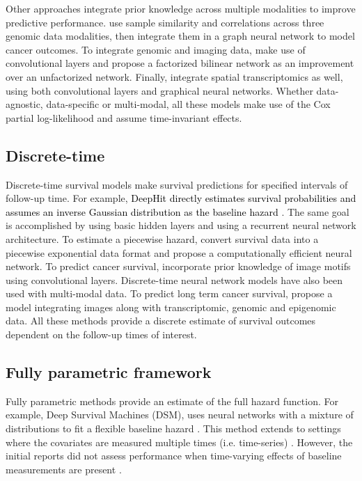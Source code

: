 \documentclass[preprint,12pt,authoryear]{elsarticle}
\begin{document}
Other approaches integrate prior knowledge across multiple modalities to improve predictive performance. \citet{hao2022joint} use sample similarity and correlations across three genomic data modalities, then integrate them in a graph neural network to model cancer outcomes. To integrate genomic and imaging data, \citet{mobadersany2018predicting} make use of convolutional layers and \citet{li2022hfbsurv} propose a factorized bilinear network as an improvement over an unfactorized network. Finally, \citet{chen2020pathomic} integrate spatial transcriptomics as well, using both convolutional layers and graphical neural networks. Whether data-agnostic, data-specific or multi-modal, all these models make use of the Cox partial log-likelihood and assume time-invariant effects.

\subsection{Discrete-time} 

Discrete-time survival models make survival predictions for specified intervals of follow-up time. For example, \textcolor{black}{DeepHit directly estimates survival probabilities and assumes an inverse Gaussian distribution as the baseline hazard \citep{lee2018DeepHit}}. The same goal is accomplished by \citet{gensheimer2019scalable} using basic hidden layers and \citet{giunchiglia2018rnn} using a recurrent neural network architecture. To estimate a piecewise hazard, \citet{kopper2022deeppamm} convert survival data into a piecewise exponential data format and propose a computationally efficient neural network. To predict cancer survival, \citet{wulczyn2020deep} incorporate prior knowledge of image motifs using convolutional layers. Discrete-time neural network models have also been used with multi-modal data. To predict long term cancer survival, \citet{vale2021long} propose a model integrating images along with transcriptomic, genomic and epigenomic data. All these methods provide a discrete estimate of survival outcomes dependent on the follow-up times of interest.

\subsection{Fully parametric framework}

 Fully parametric methods provide an estimate of the full hazard function. For example, Deep Survival Machines (DSM), uses neural networks with a mixture of distributions to fit a flexible baseline hazard \citep{dsmPaper}. This method extends to settings where the covariates are measured multiple times (i.e. time-series) \citep{nagpal2021deep}. However, the initial reports did not assess performance when time-varying effects of baseline measurements are present \citep{dsmPaper} \citep{nagpal2021deep}.
\end{document}
